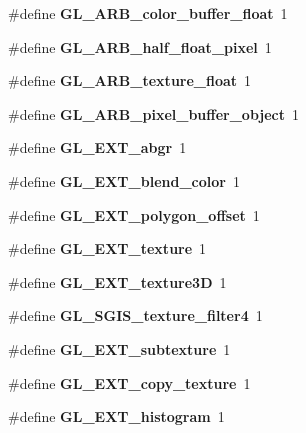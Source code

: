 \begin{DoxyCompactItemize}
\item 
\#define {\bfseries G\+L\+\_\+\+A\+R\+B\+\_\+color\+\_\+buffer\+\_\+float}~1\label{_s_d_l__opengl_8h_a38e73521b5b547c1448c33549a1eba5d}

\item 
\#define {\bfseries G\+L\+\_\+\+A\+R\+B\+\_\+half\+\_\+float\+\_\+pixel}~1\label{_s_d_l__opengl_8h_a4e91f621aef441919bb51654bb2f0a69}

\item 
\#define {\bfseries G\+L\+\_\+\+A\+R\+B\+\_\+texture\+\_\+float}~1\label{_s_d_l__opengl_8h_ac3e948a54c5ae85169ec08c3a3a5b49c}

\item 
\#define {\bfseries G\+L\+\_\+\+A\+R\+B\+\_\+pixel\+\_\+buffer\+\_\+object}~1\label{_s_d_l__opengl_8h_a38b496275aa12602b8ad063104d117b0}

\item 
\#define {\bfseries G\+L\+\_\+\+E\+X\+T\+\_\+abgr}~1\label{_s_d_l__opengl_8h_a5c0113fc017a20aa98c7dd09e5c6b651}

\item 
\#define {\bfseries G\+L\+\_\+\+E\+X\+T\+\_\+blend\+\_\+color}~1\label{_s_d_l__opengl_8h_ae52dcf5d32b30bca495c34ead9b66c1d}

\item 
\#define {\bfseries G\+L\+\_\+\+E\+X\+T\+\_\+polygon\+\_\+offset}~1\label{_s_d_l__opengl_8h_ad3e3822d73d2b10a577dcae3aacf8f38}

\item 
\#define {\bfseries G\+L\+\_\+\+E\+X\+T\+\_\+texture}~1\label{_s_d_l__opengl_8h_a0ad74c04d9f14a6790e9546b8258c3de}

\item 
\#define {\bfseries G\+L\+\_\+\+E\+X\+T\+\_\+texture3\+D}~1\label{_s_d_l__opengl_8h_af42b23bc79791783cef8b3d961f29371}

\item 
\#define {\bfseries G\+L\+\_\+\+S\+G\+I\+S\+\_\+texture\+\_\+filter4}~1\label{_s_d_l__opengl_8h_a55c3a8c248d0202bbe8da3441032c7db}

\item 
\#define {\bfseries G\+L\+\_\+\+E\+X\+T\+\_\+subtexture}~1\label{_s_d_l__opengl_8h_a2a56b245f90ee5827c2a31ba1e6bd431}

\item 
\#define {\bfseries G\+L\+\_\+\+E\+X\+T\+\_\+copy\+\_\+texture}~1\label{_s_d_l__opengl_8h_a7f0153d0680cb8629504a7bed8bc2c02}

\item 
\#define {\bfseries G\+L\+\_\+\+E\+X\+T\+\_\+histogram}~1\label{_s_d_l__opengl_8h_a15e9c43c5e863def30c3f0b5dcdc55e5}


\end{DoxyCompactItemize}
